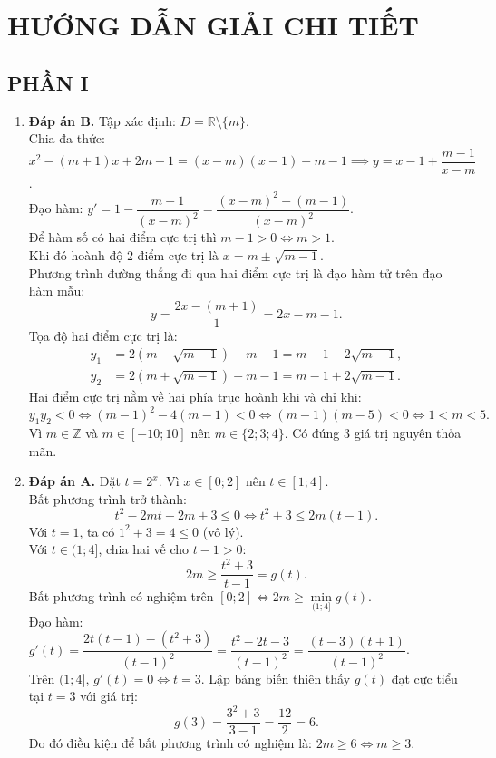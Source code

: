 \documentclass[12pt,a4paper]{article}
\begin{document}
\newpage
\section*{HƯỚNG DẪN GIẢI CHI TIẾT}

\subsection*{PHẦN I}
\begin{enumerate}[label=\textbf{Câu \arabic*:}, leftmargin=*]
\item \textbf{Đáp án B.}
Tập xác định: $D = \mathbb{R} \setminus \{m\}$.\\
Chia đa thức: $x^2 - (m+1)x + 2m - 1 = (x - m)(x - 1) + m - 1 \implies y = x - 1 + \dfrac{m - 1}{x - m}$.\\
Đạo hàm: $y' = 1 - \dfrac{m - 1}{(x - m)^2} = \dfrac{(x - m)^2 - (m - 1)}{(x - m)^2}$.\\
Để hàm số có hai điểm cực trị thì $m - 1 > 0 \iff m > 1$.\\
Khi đó hoành độ 2 điểm cực trị là $x = m \pm \sqrt{m - 1}$.\\
Phương trình đường thẳng đi qua hai điểm cực trị là đạo hàm tử trên đạo hàm mẫu:
$$y = \dfrac{2x - (m + 1)}{1} = 2x - m - 1.$$
Tọa độ hai điểm cực trị là:
\begin{align*}
y_1 &= 2(m - \sqrt{m - 1}) - m - 1 = m - 1 - 2\sqrt{m - 1}, \\
y_2 &= 2(m + \sqrt{m - 1}) - m - 1 = m - 1 + 2\sqrt{m - 1}.
\end{align*}
Hai điểm cực trị nằm về hai phía trục hoành khi và chỉ khi:
$$y_1 y_2 < 0 \iff (m - 1)^2 - 4(m - 1) < 0 \iff (m - 1)(m - 5) < 0 \iff 1 < m < 5.$$
Vì $m \in \mathbb{Z}$ và $m \in [-10; 10]$ nên $m \in \{2; 3; 4\}$. Có đúng $3$ giá trị nguyên thỏa mãn.

\item \textbf{Đáp án A.}
Đặt $t = 2^x$. Vì $x \in [0; 2]$ nên $t \in [1; 4]$.\\
Bất phương trình trở thành:
$$t^2 - 2mt + 2m + 3 \le 0 \iff t^2 + 3 \le 2m(t - 1).$$
Với $t = 1$, ta có $1^2 + 3 = 4 \le 0$ (vô lý).\\
Với $t \in (1; 4]$, chia hai vế cho $t - 1 > 0$:
$$2m \ge \dfrac{t^2 + 3}{t - 1} = g(t).$$
Bất phương trình có nghiệm trên $[0; 2] \iff 2m \ge \min\limits_{(1; 4]} g(t)$.\\
Đạo hàm: $g'(t) = \dfrac{2t(t - 1) - (t^2 + 3)}{(t - 1)^2} = \dfrac{t^2 - 2t - 3}{(t - 1)^2} = \dfrac{(t - 3)(t + 1)}{(t - 1)^2}$.\\
Trên $(1; 4]$, $g'(t) = 0 \iff t = 3$. Lập bảng biến thiên thấy $g(t)$ đạt cực tiểu tại $t = 3$ với giá trị:
$$g(3) = \dfrac{3^2 + 3}{3 - 1} = \dfrac{12}{2} = 6.$$
Do đó điều kiện để bất phương trình có nghiệm là: $2m \ge 6 \iff m \ge 3$.


\end{enumerate}
\end{document}
